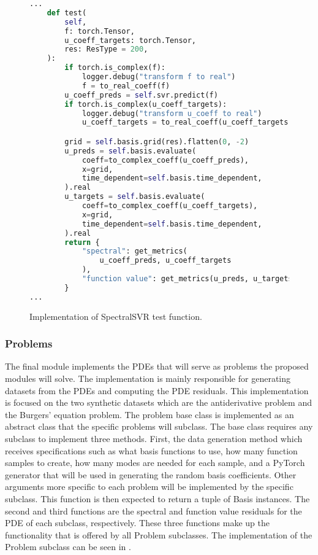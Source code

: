 \begin{figure}[H]
  \centering
  \begin{lstlisting}[language=Python]
...
    def test(
        self,
        f: torch.Tensor,
        u_coeff_targets: torch.Tensor,
        res: ResType = 200,
    ):
        if torch.is_complex(f):
            logger.debug("transform f to real")
            f = to_real_coeff(f)
        u_coeff_preds = self.svr.predict(f)
        if torch.is_complex(u_coeff_targets):
            logger.debug("transform u_coeff to real")
            u_coeff_targets = to_real_coeff(u_coeff_targets)

        grid = self.basis.grid(res).flatten(0, -2)
        u_preds = self.basis.evaluate(
            coeff=to_complex_coeff(u_coeff_preds),
            x=grid,
            time_dependent=self.basis.time_dependent,
        ).real
        u_targets = self.basis.evaluate(
            coeff=to_complex_coeff(u_coeff_targets),
            x=grid,
            time_dependent=self.basis.time_dependent,
        ).real
        return {
            "spectral": get_metrics(
                u_coeff_preds, u_coeff_targets
            ),
            "function value": get_metrics(u_preds, u_targets),
        }
...
  \end{lstlisting}
  \caption{Implementation of SpectralSVR test function.}\label{fig:spectralsvr_test_impl}
\end{figure}

\subsubsection{Problems}

\noindent The final module implements the PDEs that will serve as problems the proposed modules will solve. The implementation is mainly responsible for generating datasets from the PDEs and computing the PDE residuals. This implementation is focused on the two synthetic datasets which are the antiderivative problem and the Burgers' equation problem. The problem base class is implemented as an abstract class that the specific problems will subclass. The base class requires any subclass to implement three methods. First, the data generation method which receives specifications such as what basis functions to use, how many function samples to create, how many modes are needed for each sample, and a PyTorch generator that will be used in generating the random basis coefficients. Other arguments more specific to each problem will be implemented by the specific subclass. This function is then expected to return a tuple of Basis instances. The second and third functions are the spectral and function value residuals for the PDE of each subclass, respectively. These three functions make up the functionality that is offered by all Problem subclasses. The implementation of the Problem subclass can be seen in .

